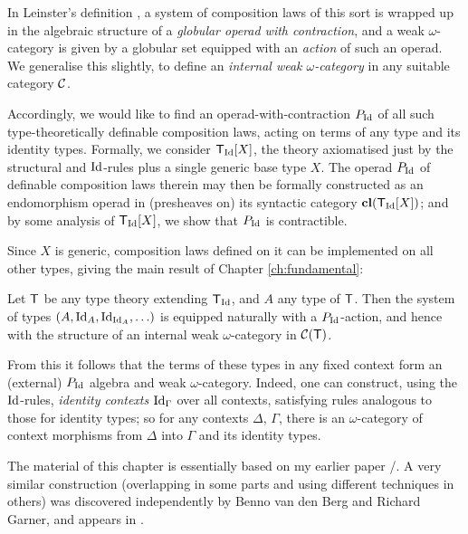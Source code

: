 \begin{para}In Leinster's definition \cite{leinster:book}, a system of composition laws of this sort is wrapped up in the algebraic structure of a \emph{globular operad with contraction}, and a weak $\omega$-category is given by a globular set equipped with an \emph{action} of such an operad.  We generalise this slightly, to define an \emph{internal weak $\omega$-category} in any suitable category $\mathcal{C}$.

Accordingly, we would like to find an operad-with-contraction $P_{\mathrm{Id}}$ of all such type-theoretically definable composition laws, acting on terms of any type and its identity types.  Formally, we consider $\mathsf{T}_{\mathrm{Id}}[X]$, the theory axiomatised just by the structural and $\mathrm{Id}$-rules plus a single generic base type $X$.  The operad $P_{\mathrm{Id}}$ of definable composition laws therein may then be formally constructed as an endomorphism operad in (presheaves on) its syntactic category $\mathbf{cl}(\mathsf{T}_{\mathrm{Id}} [X])$; and by some analysis of $\mathsf{T}_{\mathrm{Id}}[X]$, we show that $P_{\mathrm{Id}}$ is contractible.
\end{para}

Since $X$ is generic, composition laws defined on it can be implemented on all other types, giving the main result of Chapter \ref{ch:fundamental}: 

\begin{mainthmfund}Let $\mathsf{T}$ be any type theory extending $\mathsf{T}_{\mathrm{Id}}$, and $A$ any type of $\mathsf{T}$.  Then the system of types $(A, \mathrm{Id}_A, \mathrm{Id}_{\mathrm{Id}_A}, \ldots)$ is equipped naturally with a $P_{\mathrm{Id}}$-action, and hence with the structure of an internal weak $\omega$-category in $\mathcal{C}(\mathsf{T})$.
\end{mainthmfund}

From this it follows that the terms of these types in any fixed context form an (external) $P_{\mathrm{Id}}$ algebra and weak $\omega$-category.  Indeed, one can construct, using the $\mathrm{Id}$-rules, \emph{identity contexts} $\mathrm{Id}_\Gamma$ over all contexts, satisfying rules analogous to those for identity types; so for any contexts $\Delta$, $\Gamma$, there is an $\omega$-category of context morphisms from $\Delta$ into $\Gamma$ and its identity types.

The material of this chapter is essentially based on my earlier paper \cite{lumsdaine:tlca-proceedings}/\cite{lumsdaine:weak-w-cats-from-itt-lmcs}.  A very similar construction (overlapping in some parts and using different techniques in others)  was discovered independently by Benno van den Berg and Richard Garner, and appears in \cite{garner-van-den-berg}. \\

